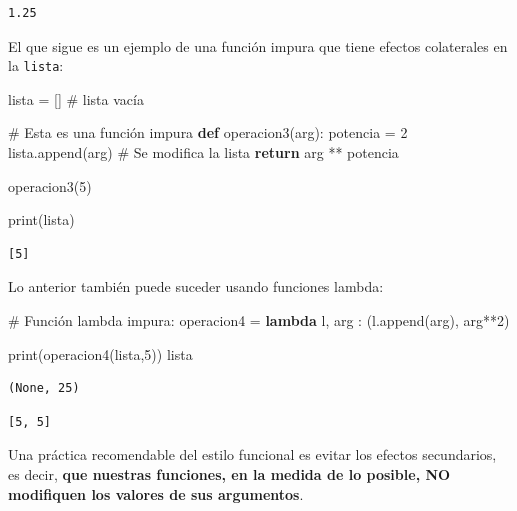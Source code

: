 \documentclass[
  spanish,
  letterpaper,
]{scrbook}
\newenvironment{Shaded}{\begin{snugshade}}{\end{snugshade}}
\newcommand{\BuiltInTok}[1]{\textcolor[rgb]{0.00,0.23,0.31}{#1}}
\newcommand{\CommentTok}[1]{\textcolor[rgb]{0.37,0.37,0.37}{#1}}
\newcommand{\ControlFlowTok}[1]{\textcolor[rgb]{0.00,0.23,0.31}{\textbf{#1}}}
\newcommand{\DecValTok}[1]{\textcolor[rgb]{0.68,0.00,0.00}{#1}}
\newcommand{\KeywordTok}[1]{\textcolor[rgb]{0.00,0.23,0.31}{\textbf{#1}}}
\newcommand{\NormalTok}[1]{\textcolor[rgb]{0.00,0.23,0.31}{#1}}
\newcommand{\OperatorTok}[1]{\textcolor[rgb]{0.37,0.37,0.37}{#1}}
\theoremstyle{definition}
\theoremstyle{remark}
\begin{document}
\begin{verbatim}
1.25
\end{verbatim}

El que sigue es un ejemplo de una función impura que tiene efectos
colaterales en la \texttt{lista}:

\begin{Shaded}
\begin{Highlighting}[]
\NormalTok{lista }\OperatorTok{=}\NormalTok{ [] }\CommentTok{\# lista vacía}

\CommentTok{\# Esta es una función impura}
\KeywordTok{def}\NormalTok{ operacion3(arg):}
\NormalTok{    potencia }\OperatorTok{=} \DecValTok{2}
\NormalTok{    lista.append(arg) }\CommentTok{\# Se modifica la lista}
    \ControlFlowTok{return}\NormalTok{ arg }\OperatorTok{**}\NormalTok{ potencia}

\NormalTok{operacion3(}\DecValTok{5}\NormalTok{)}

\BuiltInTok{print}\NormalTok{(lista)}
\end{Highlighting}
\end{Shaded}

\begin{verbatim}
[5]
\end{verbatim}

Lo anterior también puede suceder usando funciones lambda:

\begin{Shaded}
\begin{Highlighting}[]
\CommentTok{\# Función lambda impura:}
\NormalTok{operacion4 }\OperatorTok{=} \KeywordTok{lambda}\NormalTok{ l, arg : (l.append(arg), arg}\OperatorTok{**}\DecValTok{2}\NormalTok{)}
\end{Highlighting}
\end{Shaded}

\begin{Shaded}
\begin{Highlighting}[]
\BuiltInTok{print}\NormalTok{(operacion4(lista,}\DecValTok{5}\NormalTok{))}
\NormalTok{lista}
\end{Highlighting}
\end{Shaded}

\begin{verbatim}
(None, 25)
\end{verbatim}

\begin{verbatim}
[5, 5]
\end{verbatim}

Una práctica recomendable del estilo funcional es evitar los efectos
secundarios, es decir, \textbf{que nuestras funciones, en la medida de
lo posible, NO modifiquen los valores de sus argumentos}.
\end{document}

